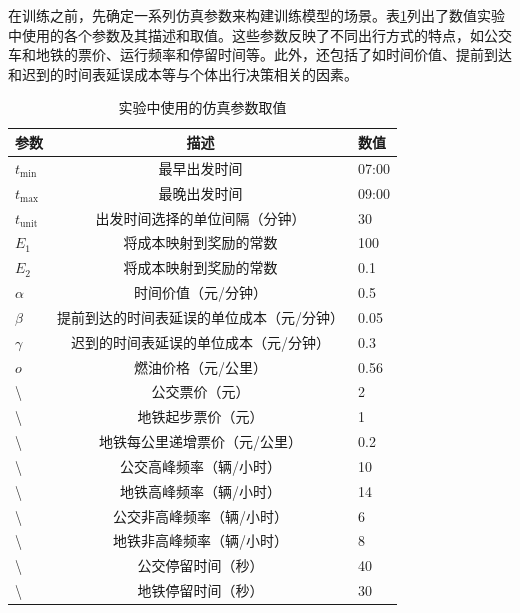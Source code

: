 在训练之前，先确定一系列仿真参数来构建训练模型的场景。表\ref{public}列出了数值实验中使用的各个参数及其描述和取值。这些参数反映了不同出行方式的特点，如公交车和地铁的票价、运行频率和停留时间等。此外，还包括了如时间价值、提前到达和迟到的时间表延误成本等与个体出行决策相关的因素。
\renewcommand{\arraystretch}{1.2}
\setlength{\tabcolsep}{8mm}
\begin{table}[htbp]
\centering
\caption{实验中使用的仿真参数取值}
\label{public}
\begin{tabular}{lcl}
\toprule
参数 & 描述                                                 & 数值 \\ 
\midrule
$t_\text{min}$  & 最早出发时间                                     & 07:00 \\
$t_\text{max}$  & 最晚出发时间                                     & 09:00 \\
$t_\text{unit}$  & 出发时间选择的单位间隔（分钟）                   & 30    \\
$E_1$  & 将成本映射到奖励的常数                               & 100   \\
$E_2$  & 将成本映射到奖励的常数                               & 0.1   \\
$\alpha$  & 时间价值（元/分钟）                               & 0.5   \\
$\beta$  & 提前到达的时间表延误的单位成本（元/分钟）           & 0.05  \\
$\gamma$  & 迟到的时间表延误的单位成本（元/分钟）             & 0.3   \\
$o$  & 燃油价格（元/公里）                                 & 0.56  \\
\textbackslash{}  & 公交票价（元）                             & 2     \\
\textbackslash{}  & 地铁起步票价（元）                         & 1     \\
\textbackslash{}  & 地铁每公里递增票价（元/公里）               & 0.2   \\
\textbackslash{}  & 公交高峰频率（辆/小时）                      & 10    \\
\textbackslash{}  & 地铁高峰频率（辆/小时）                      & 14    \\
\textbackslash{}  & 公交非高峰频率（辆/小时）                    & 6     \\
\textbackslash{}  & 地铁非高峰频率（辆/小时）                    & 8     \\
\textbackslash{}  & 公交停留时间（秒）                           & 40    \\
\textbackslash{}  & 地铁停留时间（秒）                           & 30    \\ 
\bottomrule
\end{tabular}
\end{table}



